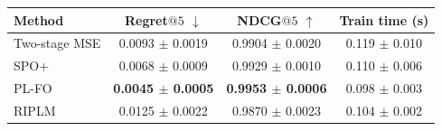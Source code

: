 \begin{tabular}{lccc}
\toprule
Method & Regret$@5$ $\downarrow$ & NDCG$@5$ $\uparrow$ & Train time (s) \\
\midrule
Two-stage MSE & 0.0093 $\pm$ 0.0019 & 0.9904 $\pm$ 0.0020 & 0.119 $\pm$ 0.010 \\
SPO+ & 0.0068 $\pm$ 0.0009 & 0.9929 $\pm$ 0.0010 & 0.110 $\pm$ 0.006 \\
PL-FO & \textbf{0.0045 $\pm$ 0.0005} & \textbf{0.9953 $\pm$ 0.0006} & 0.098 $\pm$ 0.003 \\
RIPLM & 0.0125 $\pm$ 0.0022 & 0.9870 $\pm$ 0.0023 & 0.104 $\pm$ 0.002 \\
\bottomrule
\end{tabular}